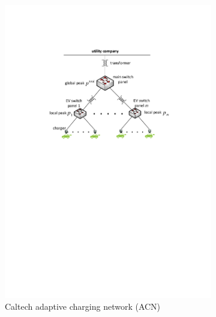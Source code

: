 \documentclass[journal]{IEEEtran}
\begin{document}
\begin{figure}	
\centering
{}
				\begin{subfigure}[b]{0.69\textwidth}
					\begin{center}
						\includegraphics[width=\textwidth]{model-a.pdf}
						\caption{Caltech adaptive charging network (ACN)}
						\label{fig:model-a}
					\end{center}
				\end{subfigure}%
				\begin{subfigure}[b]{0.29\textwidth}
					\begin{center}

\end{center}
\end{subfigure}
\end{figure}
\end{document}
